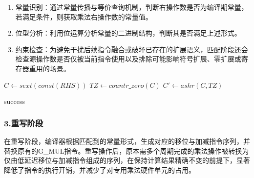 \begin{enumerate}
	\item
	常量识别：通过常量传播与等价查询机制，判断右操作数是否为编译期常量，若满足条件，则获取乘法右操作数的常量值。
	
	\item
	位型分析：利用位运算分析常量的二进制结构，判断其是否满足上述形式。
	
	\item 
	约束检查：为避免干扰后续指令融合或破坏已存在的扩展语义，匹配阶段还会检查源操作数是否仅被当前指令使用以及排除可能影响符号扩展、零扩展或寄存器重用的场景。
	
\end{enumerate}

\begin{algorithm}[htbp]
	\SetAlgoLined
	\linespread{1}\selectfont
	
	\caption{Constant-Multiply Strength Reduction}
	\label{alg:const_mul_strength_reduction}
	
	
	$C \leftarrow sext(const(RHS))$\;
	$TZ \leftarrow countr\_zero(C)$\;
	$C' \leftarrow ashr(C, TZ)$\;
	
	
	\Return success\;
\end{algorithm}


\subsubsection{3.重写阶段}
在重写阶段，编译器根据匹配到的常量形式，生成对应的移位与加减指令序列，并替换原有的G\_MUL指令。重写操作后，原本需多个周期完成的乘法操作被转换为仅由低延迟移位与加减指令组成的序列，在保持计算结果精确不变的前提下，显著降低了指令的执行开销，并减少了对专用乘法硬件单元的占用。


